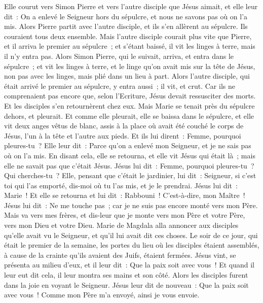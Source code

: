 \begin{multicols}{2}
Elle courut vers Simon Pierre et vers l'autre disciple que Jésus aimait, et elle leur dit~: On a enlevé le Seigneur hors du sépulcre, et nous ne savons pas où on l'a mis.
Alors Pierre partit avec l'autre disciple, et ils s'en allèrent au sépulcre.
Ils couraient tous deux ensemble. Mais l'autre disciple courait plus vite que Pierre, et il arriva le premier au sépulcre~;
et s'étant baissé, il vit les linges à terre, mais il n'y entra pas.
Alors Simon Pierre, qui le suivait, arriva, et entra dans le sépulcre~; et vit les linges à terre,
et le linge qu'on avait mis sur la tête de Jésus, non pas avec les linges, mais plié dans un lieu à part.
Alors l'autre disciple, qui était arrivé le premier au sépulcre, y entra aussi~; il vit, et crut.
Car ils ne comprenaient pas encore que, selon l'Ecriture, Jésus devait ressusciter des morts.
Et les disciples s'en retournèrent chez eux.
Mais Marie se tenait près du sépulcre dehors, et pleurait. Et comme elle pleurait, elle se baissa dans le sépulcre,
et elle vit deux anges vêtus de blanc, assis à la place où avait été couché le corps de Jésus, l'un à la tête et l'autre aux pieds.
Et ils lui dirent~: Femme, pourquoi pleures-tu~? Elle leur dit~: Parce qu'on a enlevé mon Seigneur, et je ne sais pas où on l'a mis.
En disant cela, elle se retourna, et elle vit Jésus qui était là~; mais elle ne savait pas que c'était Jésus.
Jésus lui dit~: Femme, pourquoi pleures-tu~? Qui cherches-tu~? Elle, pensant que c'était le jardinier, lui dit~: Seigneur, si c'est toi qui l'as emporté, dis-moi où tu l'as mis, et je le prendrai.
Jésus lui dit~: Marie~! Et elle se retourna et lui dit~: Rabbouni~! C'est-à-dire, mon Maître~!
Jésus lui dit~: Ne me touche pas~; car je ne suis pas encore monté vers mon Père. Mais va vers mes frères, et dis-leur que je monte vers mon Père et votre Père, vers mon Dieu et votre Dieu.
Marie de Magdala alla annoncer aux disciples qu'elle avait vu le Seigneur, et qu'il lui avait dit ces choses.
Le soir de ce jour, qui était le premier de la semaine, les portes du lieu où les disciples étaient assemblés, à cause de la crainte qu'ils avaient des Juifs, étaient fermées. Jésus vint, se présenta au milieu d'eux, et il leur dit~: Que la paix soit avec vous~!
Et quand il leur eut dit cela, il leur montra ses mains et son côté. Alors les disciples furent dans la joie en voyant le Seigneur.
Jésus leur dit de nouveau~: Que la paix soit avec vous~! Comme mon Père m'a envoyé, ainsi je vous envoie.

\end{multicols}
